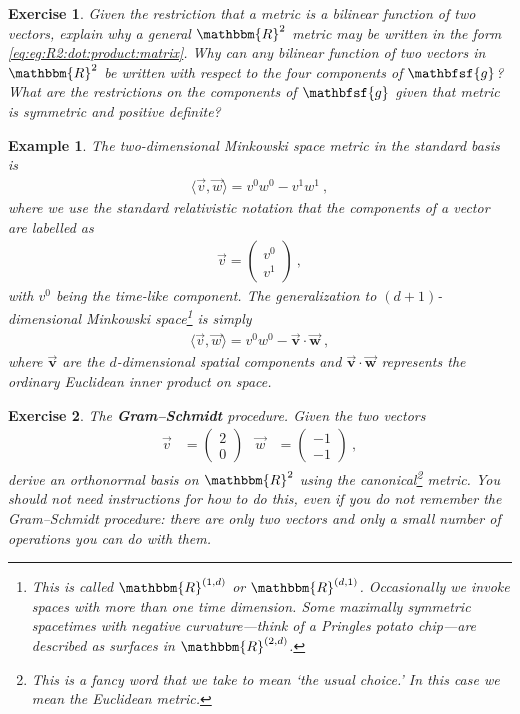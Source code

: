 \documentclass[
  11pt,
	colorful,
	raggedright,
]{tufte-style-thesis-flip}
\newtheorem{exercise}{Exercise}[section]
\newtheorem{example}{Example}[section]
\newcommand{\tens}[1]{\mathbfsf{#1}}
\begin{document}
\begin{exercise}
Given the restriction that a metric is a bilinear function of two vectors, explain why a general $\mathbbm{R}^2$ metric may be written in the form 
\eqref{eq:eg:R2:dot:product:matrix}. Why can any bilinear function of two vectors in $\mathbbm{R}^2$ be written with respect to the four components of $\tens{g}$? What are the restrictions on the components of $\tens{g}$ given that metric is symmetric and positive definite?
\end{exercise}

\begin{example}
The two-dimensional Minkowski space metric in the standard basis is
\begin{align}
  \langle\vec{v},\vec{w}\rangle = v^0w^0 - v^1w^1 \ ,
\end{align}
where we use the standard relativistic notation that the components of a vector are labelled as
\begin{align}
  \vec v = 
  \begin{pmatrix}
    v^0 \\ v^1
  \end{pmatrix} \ ,
\end{align}
with $v^0$ being the time-like component. The generalization to $(d+1)$-dimensional Minkowski space\footnote{This is called $\mathbbm{R}^{(1,d)}$ or $\mathbbm{R}^{(d,1)}$. Occasionally we invoke spaces with more than one time dimension. Some maximally symmetric spacetimes with negative curvature---think of a Pringles potato chip---are described as surfaces in $\mathbbm{R}^{(2,d)}$.} is simply
\begin{align}
  \langle \vec{v},\vec{w}\rangle = 
  v^0w^0 - \overrightarrow{\mathbf{v}}\cdot \overrightarrow{\mathbf{w}} \ ,
  \label{eq:Minkowski:metric}
\end{align}
where $\overrightarrow{\mathbf{v}}$ are the $d$-dimensional spatial components and $\overrightarrow{\mathbf{v}}\cdot \overrightarrow{\mathbf{w}}$ represents the ordinary Euclidean inner product on space.
\end{example}

\begin{exercise}\label{ex:gram:schmidt}The \textbf{Gram--Schmidt} procedure. Given the two vectors
\begin{align}
\vec v &=
\begin{pmatrix}
     2\\0
\end{pmatrix}   
&
\vec w &=
\begin{pmatrix}
     -1\\-1
\end{pmatrix} \ ,  
\end{align}
derive an orthonormal basis on $\mathbbm{R}^2$ using the canonical\footnote{This is a fancy word that we take to mean `the usual choice.' In this case we mean the Euclidean metric.} metric. You should not need instructions for how to do this, even if you do not remember the Gram--Schmidt procedure: there are only two vectors and only a small number of operations you can do with them.
\end{exercise}
\end{document}
